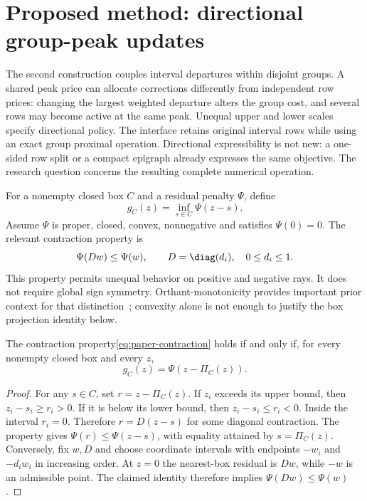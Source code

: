 \section{Proposed method: directional group-peak updates}\label{sec:directional}
The second construction couples interval departures within disjoint
groups. A shared peak price can allocate corrections differently from
independent row prices: changing the largest weighted departure alters
the group cost, and several rows may become active at the same peak.
Unequal upper and lower scales specify directional policy. The interface
retains original interval rows while using an exact group proximal
operation. Directional expressibility is not new: a one-sided row split
or a compact epigraph already expresses the same objective. The research
question concerns the resulting complete numerical operation.

For a nonempty closed box $C$ and a residual penalty $\Psi$, define
\begin{equation}\label{eq:paper-infimal}
 g_C(z)=\inf_{s\in C}\Psi(z-s).
\end{equation}
Assume $\Psi$ is proper, closed, convex, nonnegative and satisfies
$\Psi(0)=0$. The relevant contraction property is
\begin{equation}\label{eq:paper-contraction}
 \Psi(Dw)\leq\Psi(w),\qquad D=\diag(d_i),\quad0\leq d_i\leq1.
\end{equation}
This property permits unequal behavior on positive and negative rays.
It does not require global sign symmetry. Orthant-monotonicity provides
important prior context for that distinction~\cite{orthant}; convexity
alone is not enough to justify the box projection identity below.

\begin{theorem}\label{thm:paper-box}
The contraction property\eqref{eq:paper-contraction} holds if and only if,
for every nonempty closed box and every $z$,
\begin{equation}\label{eq:paper-box-identity}
 g_C(z)=\Psi(z-\Pi_C(z)).
\end{equation}
\end{theorem}
\begin{proof}
For any $s\in C$, set $r=z-\Pi_C(z)$. If $z_i$ exceeds its upper bound,
then $z_i-s_i\geq r_i>0$. If it is below its lower bound, then
$z_i-s_i\leq r_i<0$. Inside the interval $r_i=0$. Therefore
$r=D(z-s)$ for some diagonal contraction. The property gives
$\Psi(r)\leq\Psi(z-s)$, with equality attained by $s=\Pi_C(z)$.
Conversely, fix $w,D$ and choose coordinate intervals with endpoints
$-w_i$ and $-d_iw_i$ in increasing order. At $z=0$ the nearest-box
residual is $Dw$, while $-w$ is an admissible point. The claimed identity
therefore implies $\Psi(Dw)\leq\Psi(w)$.
\end{proof}

